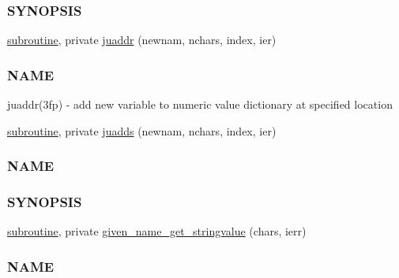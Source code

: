 \begin{DoxyCompactItemize}
\begin{DoxyCompactList}
\subsubsection*{S\+Y\+N\+O\+P\+S\+IS}\end{DoxyCompactList}\item 
\hyperlink{M__stopwatch_83_8txt_acfbcff50169d691ff02d4a123ed70482}{subroutine}, private \hyperlink{namespacem__calculator_a9306409f00c5ba6200bb68ca672b6053}{juaddr} (newnam, nchars, index, ier)
\begin{DoxyCompactList}\small\item\em \subsubsection*{N\+A\+ME}

juaddr(3fp) -\/ add new variable to numeric value dictionary at specified location \end{DoxyCompactList}\item 
\hyperlink{M__stopwatch_83_8txt_acfbcff50169d691ff02d4a123ed70482}{subroutine}, private \hyperlink{namespacem__calculator_a6d54137f485f8d2ed239b58e44cdb732}{juadds} (newnam, nchars, index, ier)
\begin{DoxyCompactList}\small\item\em \subsubsection*{N\+A\+ME}

\subsubsection*{S\+Y\+N\+O\+P\+S\+IS}\end{DoxyCompactList}\item 
\hyperlink{M__stopwatch_83_8txt_acfbcff50169d691ff02d4a123ed70482}{subroutine}, private \hyperlink{namespacem__calculator_a28e87f9e58861836dd6f7dec4bbb9311}{given\+\_\+name\+\_\+get\+\_\+stringvalue} (chars, ierr)
\begin{DoxyCompactList}\small\item\em \subsubsection*{N\+A\+ME}


\end{DoxyCompactList}
\end{DoxyCompactItemize}
